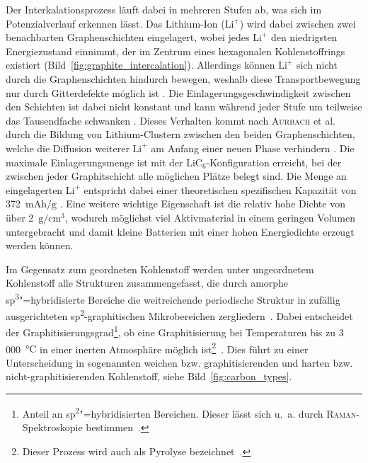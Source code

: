 Der Interkalationsprozess läuft dabei in mehreren Stufen ab, was sich im Potenzialverlauf erkennen lässt. Das Lithium-Ion ($\text{Li}^{+}$) wird dabei zwischen zwei benachbarten Graphenschichten eingelagert, wobei jedes $\text{Li}^{+}$ den niedrigsten Energiezustand einnimmt, der im Zentrum eines hexagonalen Kohlenstoffrings existiert \cite{Sole2014,Weng2023} (Bild~\ref{fig:graphite_intercalation}). Allerdings können $\text{Li}^{+}$ sich nicht durch die Graphenschichten hindurch bewegen, weshalb diese Transportbewegung nur durch Gitterdefekte möglich ist \cite{Nishidate2005}. Die Einlagerungsgeschwindigkeit zwischen den Schichten ist dabei nicht konstant und kann während jeder Stufe um teilweise das Tausendfache schwanken \cite{Levi1997}. Dieses Verhalten kommt nach \textsc{Aurbach} et al. durch die Bildung von Lithium-Clustern zwischen den beiden Graphenschichten, welche die Diffusion weiterer $\text{Li}^{+}$ am Anfang einer neuen Phase verhindern \cite{Markevich2005}. Die maximale Einlagerungsmenge ist mit der $\text{LiC}_\text{6}$-Konfiguration erreicht, bei der zwischen jeder Graphitschicht alle möglichen Plätze belegt sind. Die Menge an eingelagerten $\text{Li}^{+}$ entspricht dabei einer theoretischen spezifischen Kapazität von 372~$\si{\mA \hour \per \g}$ \cite{Winter1998}. 
Eine weitere wichtige Eigenschaft ist die relativ hohe Dichte von über 2~$\si{\g \per \cm \cubed}$, wodurch möglichst viel Aktivmaterial in einem geringen Volumen untergebracht und damit kleine Batterien mit einer hohen Energiedichte erzeugt werden können.

Im Gegensatz zum geordneten Kohlenstoff werden unter ungeordnetem Kohlenstoff alle Strukturen zusammengefasst, die durch amorphe sp\textsuperscript{3}"=hybridisierte Bereiche die weitreichende periodische Struktur in zufällig ausgerichteten sp\textsuperscript{2}-graphitischen Mikrobereichen zergliedern~\cite{Inagaki2014}. Dabei entscheidet der Graphitisierungsgrad\footnote{Anteil an sp\textsuperscript{2}"=hybridisierten Bereichen. Dieser lässt sich u.~a. durch \textsc{Raman}-Spektroskopie bestimmen~\cite{Yu2014}.}, ob eine Graphitisierung bei Temperaturen bis zu 3\,000~$\si{\degreeCelsius}$ in einer inerten Atmosphäre möglich ist\footnote{Dieser Prozess wird auch als Pyrolyse bezeichnet~\cite{Kim2017a}.}~\cite{Inagaki2014}. Dies führt zu einer Unterscheidung in sogenannten weichen bzw. graphitisierenden und harten bzw. nicht-graphitisierenden Kohlenstoff, siehe Bild~\ref{fig:carbon_types}.

